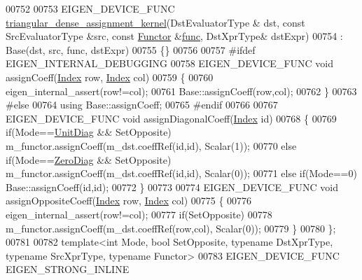 \begin{DoxyCode}
00752   
00753   EIGEN\_DEVICE\_FUNC \hyperlink{class_eigen_1_1internal_1_1triangular__dense__assignment__kernel}{triangular\_dense\_assignment\_kernel}(DstEvaluatorType &
      dst, \textcolor{keyword}{const} SrcEvaluatorType &src, \textcolor{keyword}{const} \hyperlink{struct_functor}{Functor} &\hyperlink{structfunc}{func}, DstXprType& dstExpr)
00754     : Base(dst, src, func, dstExpr)
00755   \{\}
00756   
00757 \textcolor{preprocessor}{#ifdef EIGEN\_INTERNAL\_DEBUGGING}
00758   EIGEN\_DEVICE\_FUNC \textcolor{keywordtype}{void} assignCoeff(\hyperlink{namespace_eigen_a62e77e0933482dafde8fe197d9a2cfde}{Index} row, \hyperlink{namespace_eigen_a62e77e0933482dafde8fe197d9a2cfde}{Index} col)
00759   \{
00760     eigen\_internal\_assert(row!=col);
00761     Base::assignCoeff(row,col);
00762   \}
00763 \textcolor{preprocessor}{#else}
00764   \textcolor{keyword}{using} Base::assignCoeff;
00765 \textcolor{preprocessor}{#endif}
00766   
00767   EIGEN\_DEVICE\_FUNC \textcolor{keywordtype}{void} assignDiagonalCoeff(\hyperlink{namespace_eigen_a62e77e0933482dafde8fe197d9a2cfde}{Index} \textcolor{keywordtype}{id})
00768   \{
00769          \textcolor{keywordflow}{if}(Mode==\hyperlink{group__enums_gga39e3366ff5554d731e7dc8bb642f83cdaddb72f888ac85d5a1c52333e54f9374b}{UnitDiag} && SetOpposite) m\_functor.assignCoeff(m\_dst.coeffRef(\textcolor{keywordtype}{id},\textcolor{keywordtype}{id}), Scalar(1));
00770     \textcolor{keywordflow}{else} \textcolor{keywordflow}{if}(Mode==\hyperlink{group__enums_gga39e3366ff5554d731e7dc8bb642f83cda884ff7240392e85aa6e4b3c957e36483}{ZeroDiag} && SetOpposite) m\_functor.assignCoeff(m\_dst.coeffRef(\textcolor{keywordtype}{id},\textcolor{keywordtype}{id}), Scalar(0));
00771     \textcolor{keywordflow}{else} \textcolor{keywordflow}{if}(Mode==0)                       Base::assignCoeff(\textcolor{keywordtype}{id},\textcolor{keywordtype}{id});
00772   \}
00773   
00774   EIGEN\_DEVICE\_FUNC \textcolor{keywordtype}{void} assignOppositeCoeff(\hyperlink{namespace_eigen_a62e77e0933482dafde8fe197d9a2cfde}{Index} row, \hyperlink{namespace_eigen_a62e77e0933482dafde8fe197d9a2cfde}{Index} col)
00775   \{ 
00776     eigen\_internal\_assert(row!=col);
00777     \textcolor{keywordflow}{if}(SetOpposite)
00778       m\_functor.assignCoeff(m\_dst.coeffRef(row,col), Scalar(0));
00779   \}
00780 \};
00781 
00782 \textcolor{keyword}{template}<\textcolor{keywordtype}{int} Mode, \textcolor{keywordtype}{bool} SetOpposite, \textcolor{keyword}{typename} DstXprType, \textcolor{keyword}{typename} SrcXprType, \textcolor{keyword}{typename} Functor>
00783 EIGEN\_DEVICE\_FUNC EIGEN\_STRONG\_INLINE

\end{DoxyCode}
